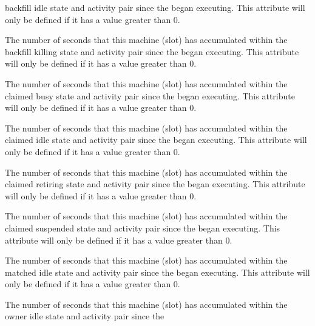 \begin{description}
backfill idle state and activity pair since the 
began executing.
This attribute will only be defined if it has a value greater than 0.
%
\item[\AdAttr{TotalTimeBackfillKilling}:] The number of seconds
that this machine (slot) has accumulated within the
backfill killing state and activity pair since the 
began executing.
This attribute will only be defined if it has a value greater than 0.
%
\item[\AdAttr{TotalTimeClaimedBusy}:] The number of seconds
that this machine (slot) has accumulated within the
claimed busy state and activity pair since the 
began executing.
This attribute will only be defined if it has a value greater than 0.
%
\item[\AdAttr{TotalTimeClaimedIdle}:] The number of seconds
that this machine (slot) has accumulated within the
claimed idle state and activity pair since the 
began executing.
This attribute will only be defined if it has a value greater than 0.
%
\item[\AdAttr{TotalTimeClaimedRetiring}:] The number of seconds
that this machine (slot) has accumulated within the
claimed retiring state and activity pair since the 
began executing.
This attribute will only be defined if it has a value greater than 0.
%
\item[\AdAttr{TotalTimeClaimedSuspended}:] The number of seconds
that this machine (slot) has accumulated within the
claimed suspended state and activity pair since the 
began executing.
This attribute will only be defined if it has a value greater than 0.
%
\item[\AdAttr{TotalTimeMatchedIdle}:] The number of seconds
that this machine (slot) has accumulated within the
matched idle state and activity pair since the 
began executing.
This attribute will only be defined if it has a value greater than 0.
%
\item[\AdAttr{TotalTimeOwnerIdle}:] The number of seconds
that this machine (slot) has accumulated within the
owner idle state and activity pair since the 

\end{description}
